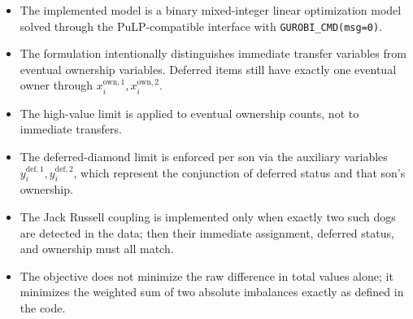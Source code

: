 \begin{itemize}
\item The implemented model is a binary mixed-integer linear optimization model solved through the PuLP-compatible interface with \texttt{GUROBI\_CMD(msg=0)}.
\item The formulation intentionally distinguishes immediate transfer variables from eventual ownership variables. Deferred items still have exactly one eventual owner through $x^{\mathrm{own},1}_i,x^{\mathrm{own},2}_i$.
\item The high-value limit is applied to eventual ownership counts, not to immediate transfers.
\item The deferred-diamond limit is enforced per son via the auxiliary variables $y^{\mathrm{def},1}_i,y^{\mathrm{def},2}_i$, which represent the conjunction of deferred status and that son's ownership.
\item The Jack Russell coupling is implemented only when exactly two such dogs are detected in the data; then their immediate assignment, deferred status, and ownership must all match.
\item The objective does not minimize the raw difference in total values alone; it minimizes the weighted sum of two absolute imbalances exactly as defined in the code.
\end{itemize}
